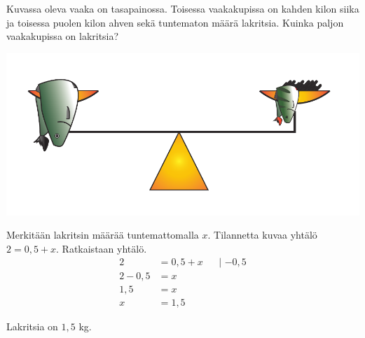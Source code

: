 \begin{esimerkki}
	Kuvassa oleva vaaka on tasapainossa. Toisessa vaakakupissa on kahden kilon siika ja toisessa puolen kilon ahven sekä tuntematon määrä lakritsia.
	Kuinka paljon vaakakupissa on lakritsia?
	\begin{center}
		\includegraphics[scale=0.6]{pictures/Kuva10-1-vaaka.pdf} %
	\end{center}
	\begin{esimratk}
		Merkitään lakritsin määrää tuntemattomalla $x$. Tilannetta kuvaa yhtälö $2 = 0,5 + x$.
		Ratkaistaan yhtälö.
		\begin{align*}
			2 &= 0,5 + x &&\text{| $-0,5$} \\
			2 - 0,5 &= x && \\
			1,5 &= x && \\
			x &= 1{,5} &&
		\end{align*}
	\end{esimratk}
	\begin{esimvast}
		Lakritsia on $1,5$ kg.
	\end{esimvast}
\end{esimerkki}

